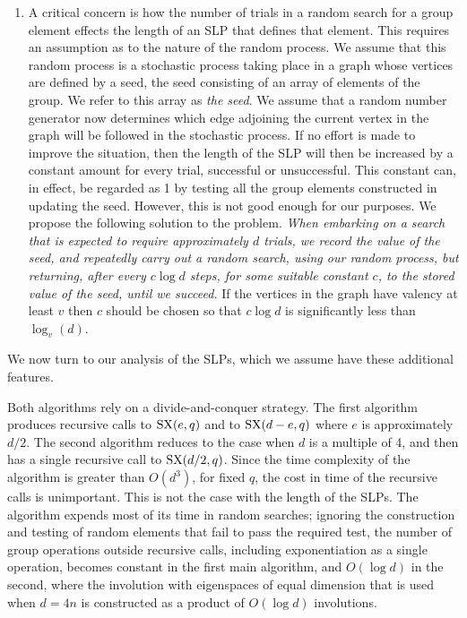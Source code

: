 \documentclass[12pt]{article}
\def\SX{{\rm SX}}
\begin{document}
\begin{enumerate}
\item 
A critical concern is how the number of trials in a random search for 
a group element effects the length of an SLP that defines that element.  
This requires an
assumption as to the nature of the random process.  We assume that this 
random process
is a stochastic process taking place in a graph whose vertices 
are defined by a seed, the seed
consisting of an array of elements of the group.  We refer to this 
array as {\it the seed}.  
We assume that a random number generator now determines which 
edge adjoining the current vertex in the graph will be followed in 
the stochastic process.
If no effort is made to improve the situation, then the length of the SLP will 
then be increased by a constant
amount for every trial, successful or unsuccessful. This constant can, 
in effect, be regarded as 1 by testing all the group elements constructed in 
updating the seed.  However, this is not good enough for our purposes.  
We propose the following solution to the problem.  {\it When embarking on a 
search that is
expected to require approximately $d$ trials, we record the value 
of the seed, and repeatedly carry
out a random search, using our random process, but returning, after 
every $c\log d$ steps, for some suitable constant $c$, to the 
stored value of the seed, until we succeed.}  If the vertices in the graph
have valency at least $v$ then $c$ should be chosen so that  
$c\log d$ is significantly less than $\log_v(d)$.  
\end{enumerate}


We now turn to our analysis of the SLPs, which we assume 
have these additional features. 

Both algorithms rely on a divide-and-conquer strategy. The first
algorithm produces recursive calls to $\SX(e,q)$ and to  $\SX(d-e,q)$
where $e$ is approximately $d/2$. The second algorithm reduces to the
case when $d$ is a multiple of 4, and then has a single recursive call
to $\SX(d/2,q)$. Since the time complexity of the algorithm is greater
than $O(d^3)$, for fixed $q$, the cost in time of the recursive calls
is unimportant. This is not the case with the length of the
SLPs. The algorithm expends most of its time in
random searches; ignoring the construction and testing of
random elements that fail to pass the required test,
the number of group
operations outside  recursive calls, including exponentiation as a
single operation, becomes constant in the first main algorithm, and 
$O(\log d)$ in
the second, where the involution with eigenspaces of equal dimension 
that is used when $d=4n$ is constructed as a product of $O(\log d)$ involutions.
\end{document}
